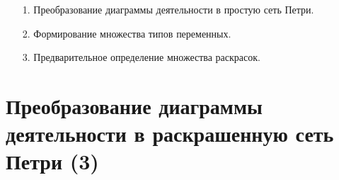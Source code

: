 \documentclass[12pt]{article}
\begin{document}
\begin{minipage}[H]{0.55\linewidth}
\end{minipage}
\hfill
\begin{minipage}[H]{0.44\linewidth}
	\begin{enumerate}
	\item[1.] Преобразование диаграммы деятельности в простую сеть Петри.
	\item[2.] Формирование множества типов переменных.
	\item[3.] Предварительное определение множества раскрасок.
	\end{enumerate}
\end{minipage}

\section{Преобразование диаграммы деятельности в раскрашенную сеть  Петри (3)}
\end{document}
